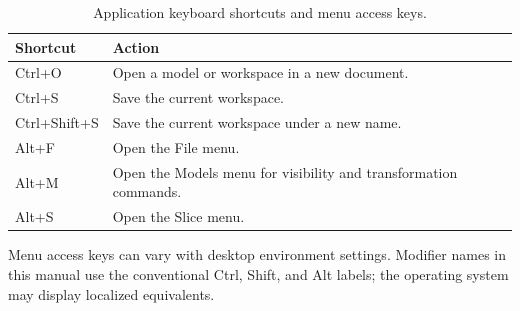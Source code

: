 \begin{table}[htbp]
    \centering
    \begin{tabularx}{\textwidth}{@{}>{\ttfamily}p{}Y@{}}
        \toprule
        \normalfont\bfseries Shortcut & \bfseries Action \\
        \midrule
        Ctrl+O & Open a model or workspace in a new document. \\
        Ctrl+S & Save the current workspace. \\
        Ctrl+Shift+S & Save the current workspace under a new name. \\
        Alt+F  & Open the File menu. \\
        Alt+M  & Open the Models menu for visibility and transformation commands. \\
        Alt+S  & Open the Slice menu. \\
        \bottomrule
    \end{tabularx}
    \caption{Application keyboard shortcuts and menu access keys.}
\end{table}

Menu access keys can vary with desktop environment settings. Modifier names in
this manual use the conventional Ctrl, Shift, and Alt labels; the operating
system may display localized equivalents.
